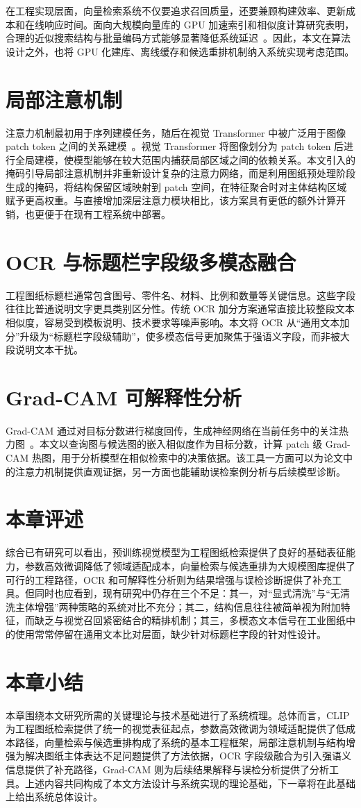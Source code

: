在工程实现层面，向量检索系统不仅要追求召回质量，还要兼顾构建效率、更新成本和在线响应时间。面向大规模向量库的 GPU 加速索引和相似度计算研究表明，合理的近似搜索结构与批量编码方式能够显著降低系统延迟~\citep{johnson2019faiss}。因此，本文在算法设计之外，也将 GPU 化建库、离线缓存和候选重排机制纳入系统实现考虑范围。

\section{局部注意机制}

注意力机制最初用于序列建模任务，随后在视觉 Transformer 中被广泛用于图像 patch token 之间的关系建模~\citep{vaswani2017attention}。视觉 Transformer 将图像划分为 patch token 后进行全局建模，使模型能够在较大范围内捕获局部区域之间的依赖关系。本文引入的掩码引导局部注意机制并非重新设计复杂的注意力网络，而是利用图纸预处理阶段生成的掩码，将结构保留区域映射到 patch 空间，在特征聚合时对主体结构区域赋予更高权重。与直接增加深层注意力模块相比，该方案具有更低的额外计算开销，也更便于在现有工程系统中部署。

\section{OCR 与标题栏字段级多模态融合}

工程图纸标题栏通常包含图号、零件名、材料、比例和数量等关键信息。这些字段往往比普通说明文字更具类别区分性。传统 OCR 加分方案通常直接比较整段文本相似度，容易受到模板说明、技术要求等噪声影响。本文将 OCR 从“通用文本加分”升级为“标题栏字段级辅助”，使多模态信号更加聚焦于强语义字段，而非被大段说明文本干扰。

\section{Grad-CAM 可解释性分析}

Grad-CAM 通过对目标分数进行梯度回传，生成神经网络在当前任务中的关注热力图~\citep{selvaraju2017gradcam}。本文以查询图与候选图的嵌入相似度作为目标分数，计算 patch 级 Grad-CAM 热图，用于分析模型在相似检索中的决策依据。该工具一方面可以为论文中的注意力机制提供直观证据，另一方面也能辅助误检案例分析与后续模型诊断。

\section{本章评述}

综合已有研究可以看出，预训练视觉模型为工程图纸检索提供了良好的基础表征能力，参数高效微调降低了领域适配成本，向量检索与候选重排为大规模图库提供了可行的工程路径，OCR 和可解释性分析则为结果增强与误检诊断提供了补充工具。但同时也应看到，现有研究中仍存在三个不足：其一，对“显式清洗”与“无清洗主体增强”两种策略的系统对比不充分；其二，结构信息往往被简单视为附加特征，而缺乏与视觉召回紧密结合的精排机制；其三，多模态文本信号在工业图纸中的使用常常停留在通用文本比对层面，缺少针对标题栏字段的针对性设计。

\section{本章小结}

本章围绕本文研究所需的关键理论与技术基础进行了系统梳理。总体而言，CLIP 为工程图纸检索提供了统一的视觉表征起点，参数高效微调为领域适配提供了低成本路径，向量检索与候选重排构成了系统的基本工程框架，局部注意机制与结构增强为解决图纸主体表达不足问题提供了方法依据，OCR 字段级融合为引入强语义信息提供了补充路径，Grad-CAM 则为后续结果解释与误检分析提供了分析工具。上述内容共同构成了本文方法设计与系统实现的理论基础，下一章将在此基础上给出系统总体设计。
